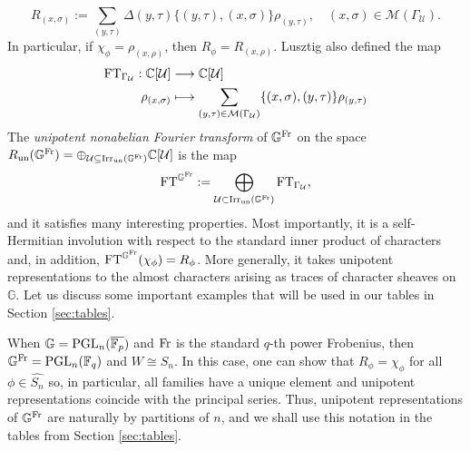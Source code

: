 $$R_{(x,\sigma)}:=\sum_{(y,\tau)}\Delta(y,\tau)\{(y,\tau),(x,\sigma)\}\rho_{(y,\tau)},\quad(x,\sigma)\in\mathcal{M}(\Gamma_\mathcal{U}).$$
In particular, if $\chi_\phi=\rho_{(x,\rho)}$, then $R_\phi=R_{(x,\rho)}$. Lusztig also defined the map 
\begin{align*}
    \mathrm{FT}_{\Gamma_\mathcal{U}}:\mathbb{C}[\mathcal{U}]&\longrightarrow\mathbb{C}[\mathcal{U}]\\
    \rho_{(x,\sigma)}&\longmapsto\sum_{(y,\tau)\in\mathcal{M}(\Gamma_\mathcal{U})}\{(x,\sigma),(y,\tau)\}\rho_{(y,\tau)}
\end{align*}
The \textit{unipotent nonabelian Fourier transform} of $\mathbb{G}^{\mathrm{Fr}}$ on the space $R_{\mathrm{un}}(\mathbb{G}^{\mathrm{Fr}})=\oplus_{\mathcal{U}\subseteq\mathrm{Irr}_{\mathrm{un}}(\mathbb{G}^{\mathrm{Fr}})}\mathbb{C}[\mathcal{U}]$ is the map
$$\mathrm{FT}^{\mathbb{G}^{\mathrm{Fr}}}:=\bigoplus_{\mathcal{U}\subset\mathrm{Irr}_{\mathrm{un}}(\mathbb{G}^{\mathrm{Fr}})}\mathrm{FT}_{\Gamma_\mathcal{U}},$$
and it satisfies many interesting properties. Most importantly, it is a self-Hermitian involution with respect to the standard inner product of characters and, in addition, $\mathrm{FT}^{\mathbb{G}^{\mathrm{Fr}}}(\chi_\phi)=R_\phi$. More generally, it takes unipotent representations to the almost characters arising as traces of character sheaves on $\mathbb{G}$. Let us discuss some important examples that will be used in our tables in Section \ref{sec:tables}.

\begin{example}
    When $\mathbb{G}=\mathrm{PGL}_n(\overline{\mathbb{F}_p})$ and $\mathrm{Fr}$ is the standard $q$-th power Frobenius, then $\mathbb{G}^{\mathrm{Fr}}=\mathrm{PGL}_n(\mathbb{F}_q)$ and $W\cong S_n$. In this case, one can show that $R_{\phi}=\chi_{\phi}$ for all $\phi\in\widehat{S_n}$ so, in particular, all families have a unique element and unipotent representations coincide with the principal series. Thus, unipotent representations of $\mathbb{G}^{\mathrm{Fr}}$ are naturally by partitions of $n$, and we shall use this notation in the tables from Section \ref{sec:tables}.
\end{example}

